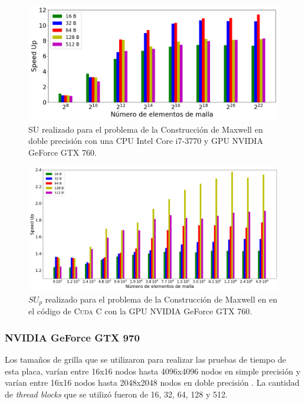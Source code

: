 \begin{figure}[htbp]
	\centering
	\includegraphics[width=\textwidth]{figs_2/cap4/s_760_MxC_double_10}
	\caption{SU realizado para el problema de la Construcción de Maxwell en doble precisión con una CPU Intel Core i7-3770 y GPU NVIDIA GeForce GTX 760.} 
	\label{fig:s_760_MxC_double_1.0}	
\end{figure}

\begin{figure}[H]
	\centering
	\includegraphics[width=\textwidth]{figs_2/cap4/c_760_MxC_cuda_10}
	\caption{$SU_p$ realizado para el problema de la Construcción de Maxwell en en el código de \textsc{Cuda C} con la GPU NVIDIA GeForce GTX 760.} 
	\label{fig:c_760_MxC_cuda_10}	
\end{figure}




\subsubsection{NVIDIA GeForce GTX 970}

Los tamaños de grilla que se utilizaron para realizar las pruebas de tiempo de esta placa, varían entre 16x16 nodos hasta 4096x4096 nodos en simple precisión y varían entre 16x16 nodos hasta 2048x2048 nodos en doble precisión . La cantidad de \textit{thread blocks} que se utilizó fueron de 16, 32, 64, 128 y 512.


